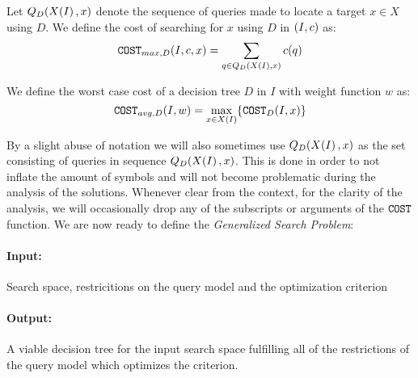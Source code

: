 Let $Q_D\mathopen{}\left( X\mathopen{}\left( I \right),x \right)$ denote the sequence of queries made to locate a target $x \in X$ using $D$. We define the cost of searching for $x$ using $D$ in $\mathopen{}\left( I,c \right)$ as:
$$
\texttt{COST}_{max,D}\mathopen{}\left( I, c, x \right) = \sum_{q\in Q_{D}\mathopen{}\left( X\mathopen{}\left( I \right),x \right)}c\mathopen{}\left( q \right)
$$

We define the worst case cost of a decision tree $D$ in $I$ with weight function $w$ as:
$$
\texttt{COST}_{avg, D}\mathopen{}\left( I, w \right) = \max_{x\in X\mathopen{}\left( I \right)} \mathopen{}\left\{ \texttt{COST}_D\mathopen{}\left( I, x \right) \right\}
$$

By a slight abuse of notation we will also sometimes use $Q_{D}\mathopen{}\left( X\mathopen{}\left( I \right),x \right)$ as the set consisting of queries in sequence $Q_{D}\mathopen{}\left( X\mathopen{}\left( I \right),x \right)$. This is done in order to not inflate the amount of symbols and will not become problematic during the analysis of the solutions.
Whenever clear from the context, for the clarity of the analysis, we will occasionally drop any of the subscripts or arguments of the $\texttt{COST}$ function.
We are now ready to define the \textit{Generalized Search Problem}:

\begin{tcolorbox}[colback=white, title=Generalized Search Problem, fonttitle=\bfseries, breakable]
\paragraph{Input:} Search space, restricitions on the query model and the optimization criterion
\paragraph{Output:} A viable decision tree for the input search space fulfilling all of the restrictions of the query model which optimizes the criterion.
\end{tcolorbox}